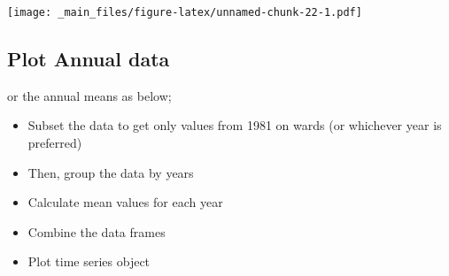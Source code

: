 \documentclass[
]{book}
\providecommand{\tightlist}{%
  \setlength{\itemsep}{0pt}\setlength{\parskip}{0pt}}
\begin{document}
\texttt{[image: \_main\_files/figure-latex/unnamed-chunk-22-1.pdf]}

\hypertarget{plot-annual-data}{%
\subsection{Plot Annual data}\label{plot-annual-data}}

or the annual means as below;

\begin{itemize}
\tightlist
\item
  Subset the data to get only values from 1981 on wards (or whichever year is preferred)
\item
  Then, group the data by years
\item
  Calculate mean values for each year
\item
  Combine the data frames
\item
  Plot time series object
\end{itemize}
\end{document}
